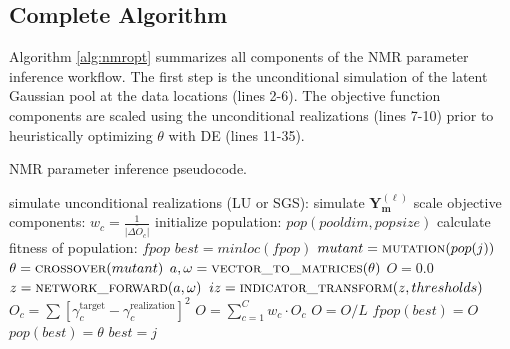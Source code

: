 \subsection{Complete Algorithm}
\label{subsec:04algorithm}

Algorithm \ref{alg:nmropt} summarizes all components of the \gls{NMR} parameter inference workflow. The first step is the unconditional simulation of the latent Gaussian pool at the data locations (lines 2-6). The objective function components are scaled using the unconditional realizations (lines 7-10) prior to heuristically optimizing $\theta$ with \gls{DE} (lines 11-35).

\begin{algorithm}
    \caption{\gls{NMR} parameter inference pseudocode.}\label{alg:nmropt}
    \begin{algorithmic}[1]
        \State simulate unconditional realizations (LU or SGS):
        \State simulate $\mathbf{Y^{(\ell)}_m}$
        \EndFor
        \EndFor
        \State scale objective components:
        \State $w_{c} = \frac{1}{\bar{|\Delta O_{c}|}}$
        \EndFor
        \State initialize population: $pop(pool dim, popsize)$ 
        \State calculate fitness of population: $fpop$
        \State $best = minloc(fpop)$ 
         
        \State $mutant = \Call{mutation}{pop(j)}$ 
        \State $\theta = \Call{crossover}{mutant}$ 
        \State $a, \omega = \Call{vector\_to\_matrices}{\theta}$ 
        \State $O = 0.0$
        \State $z = \Call{network\_forward}{a, \omega}$ 
        \State $iz = \Call{indicator\_transform}{z, thresholds}$
        \State $O_{c} = \sum [ \gamma^{\text{target}}_{c} - \gamma^{\text{realization}}_{c}]^{2}$
        \EndFor
        \State $O = \sum_{c=1}^{C}w_{c}\cdot O_{c}$
        \EndFor
        \State $O = O / L$
        \State $fpop(best) = O$ 
        \State $pop(best) = \theta$ 
        \State $best = j$ 
        \EndIf
        \EndFor
        \EndFor {}
    \end{algorithmic}
\end{algorithm}

